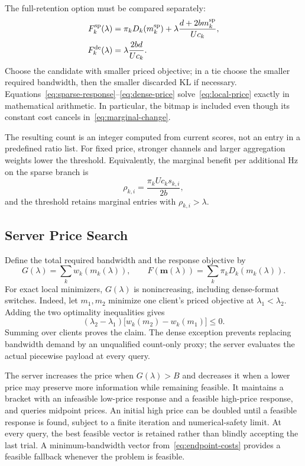 The full-retention option must be compared separately:
\begin{align}
 F_k^{\mathrm{sp}}(\lambda)
 &=\pi_kD_k(m_k^{\mathrm{sp}})
 +\lambda\frac{d+2b m_k^{\mathrm{sp}}}{Uc_k},\label{eq:sparse-price}\\
 F_k^{\mathrm{de}}(\lambda)&=\lambda\frac{2bd}{Uc_k}.
 \label{eq:dense-price}
\end{align}
Choose the candidate with smaller priced objective; in a tie choose the smaller required bandwidth, then the smaller discarded KL if necessary. Equations~\eqref{eq:sparse-response}--\eqref{eq:dense-price} solve~\eqref{eq:local-price} exactly in mathematical arithmetic. In particular, the bitmap is included even though its constant cost cancels in~\eqref{eq:marginal-change}.

The resulting count is an integer computed from current scores, not an entry in a predefined ratio list. For fixed price, stronger channels and larger aggregation weights lower the threshold. Equivalently, the marginal benefit per additional Hz on the sparse branch is
\begin{equation}
 \rho_{k,i}=\frac{\pi_kUc_ks_{k,i}}{2b},
 \label{eq:priority}
\end{equation}
and the threshold retains marginal entries with $\rho_{k,i}>\lambda$.

\subsection{Server Price Search}
Define the total required bandwidth and the response objective by
\begin{equation}
 G(\lambda)=\sum_kw_k(m_k(\lambda)),\qquad
 F(\mathbf m(\lambda))=\sum_k\pi_kD_k(m_k(\lambda)).
 \label{eq:demand}
\end{equation}
For exact local minimizers, $G(\lambda)$ is nonincreasing, including dense-format switches. Indeed, let $m_1,m_2$ minimize one client's priced objective at $\lambda_1<\lambda_2$. Adding the two optimality inequalities gives
\begin{equation}
 (\lambda_2-\lambda_1)\big[w_k(m_2)-w_k(m_1)\big]\le0.
 \label{eq:monotonicity}
\end{equation}
Summing over clients proves the claim. The dense exception prevents replacing bandwidth demand by an unqualified count-only proxy; the server evaluates the actual piecewise payload at every query.

The server increases the price when $G(\lambda)>B$ and decreases it when a lower price may preserve more information while remaining feasible. It maintains a bracket with an infeasible low-price response and a feasible high-price response, and queries midpoint prices. An initial high price can be doubled until a feasible response is found, subject to a finite iteration and numerical-safety limit. At every query, the best feasible vector is retained rather than blindly accepting the last trial. A minimum-bandwidth vector from~\eqref{eq:endpoint-costs} provides a feasible fallback whenever the problem is feasible.

